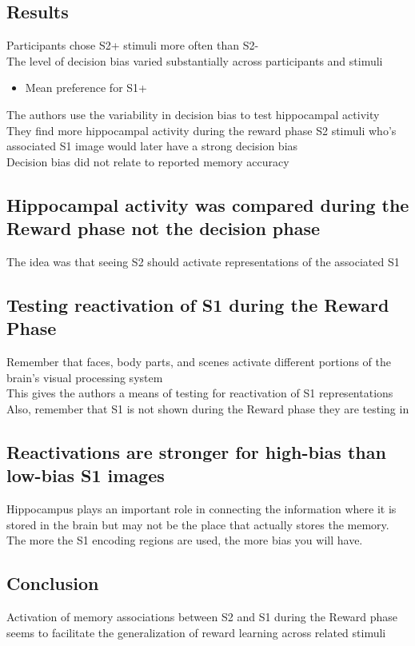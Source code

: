 \subsection{Results}
Participants chose S2+ stimuli more often than S2-
\\The level of decision bias varied substantially across participants and stimuli
\begin{itemize}
    \item Mean preference for S1+
\end{itemize}

The authors use the variability in decision bias to test hippocampal activity
\\They find more hippocampal activity during the reward phase S2 stimuli who's associated S1 image would later have a strong decision bias
\\Decision bias did not relate to reported memory accuracy
\subsection{Hippocampal activity was compared during the Reward phase not the decision phase}
The idea was that seeing S2 should activate representations of the associated S1

\subsection{Testing reactivation of S1 during the Reward Phase}
Remember that faces, body parts, and scenes activate different portions of the brain's visual processing system
\\This gives the authors a means of testing for reactivation of S1 representations
\\Also, remember that S1 is not shown during the Reward phase they are testing in
\subsection{Reactivations are stronger for high-bias than low-bias S1 images}
Hippocampus plays an important role in connecting the information where it is stored in the brain but may not be the place that actually stores the memory. The more the S1 encoding regions are used, the more bias you will have.
\subsection{Conclusion}
Activation of memory associations between S2 and S1 during the Reward phase seems to facilitate the generalization of reward learning across related stimuli

